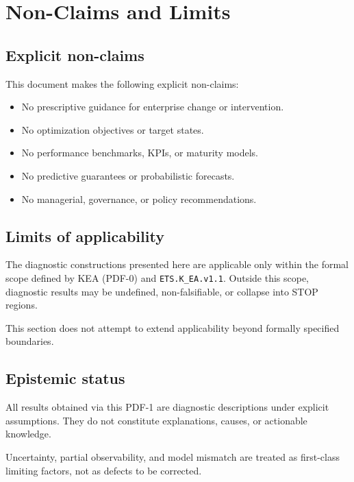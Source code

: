 
\section{Non-Claims and Limits}
\label{sec:nonclaims-limits}

\subsection{Explicit non-claims}
This document makes the following explicit non-claims:
\begin{itemize}
  \item No prescriptive guidance for enterprise change or intervention.
  \item No optimization objectives or target states.
  \item No performance benchmarks, KPIs, or maturity models.
  \item No predictive guarantees or probabilistic forecasts.
  \item No managerial, governance, or policy recommendations.
\end{itemize}

\subsection{Limits of applicability}
The diagnostic constructions presented here are applicable only within the
formal scope defined by KEA (PDF-0) and \texttt{ETS.K\_EA.v1.1}.
Outside this scope, diagnostic results may be undefined, non-falsifiable,
or collapse into STOP regions.

This section does not attempt to extend applicability beyond formally
specified boundaries.

\subsection{Epistemic status}
All results obtained via this PDF-1 are diagnostic descriptions under
explicit assumptions.
They do not constitute explanations, causes, or actionable knowledge.

Uncertainty, partial observability, and model mismatch are treated as
first-class limiting factors, not as defects to be corrected.

